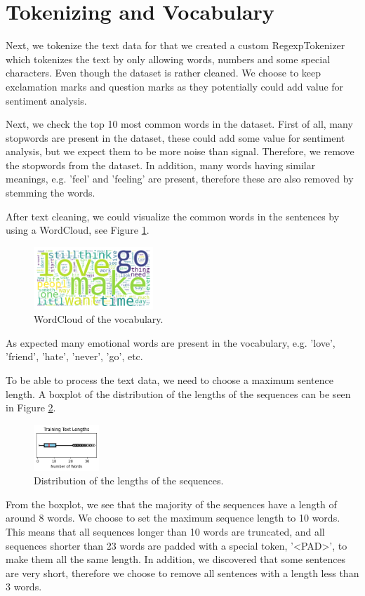 \section{Tokenizing and Vocabulary}
Next, we tokenize the text data for that we created a custom RegexpTokenizer which tokenizes the text by only allowing words, numbers and some special characters. Even though the dataset is rather cleaned. We choose to keep exclamation marks and question marks as they potentially could add value for sentiment analysis.

Next, we check the top 10 most common words in the dataset. First of all, many stopwords are present in the dataset, these could add some value for sentiment analysis, but we expect them to be more noise than signal. Therefore, we remove the stopwords from the dataset. In addition, many words having similar meanings, e.g. 'feel' and 'feeling' are present, therefore these are also removed by stemming the words.

After text cleaning, we could visualize the common words in the sentences by using a WordCloud, see Figure \ref{fig:wordcloud}.
\begin{figure}[H]
    \vspace*{0.7cm}
    \centering
    \includegraphics[width=0.4\textwidth]{figures/wordcloud.png}
    \caption{WordCloud of the vocabulary.}
    \label{fig:wordcloud}
    \vspace*{0.7cm}
\end{figure}
As expected many emotional words are present in the vocabulary, e.g. 'love', 'friend', 'hate', 'never', 'go', etc. 

To be able to process the text data, we need to choose a maximum sentence length. A boxplot of the distribution of the lengths of the sequences can be seen in Figure \ref{fig:sequence_length}.
\begin{figure}[H]
    \vspace*{0.7cm}
    \centering
    \includegraphics[width=0.22\textwidth]{figures/sentence_length.png}
    \caption{Distribution of the lengths of the sequences.}
    \label{fig:sequence_length}
    \vspace*{0.7cm}
\end{figure}
From the boxplot, we see that the majority of the sequences have a length of around 8 words. We choose to set the maximum sequence length to 10 words. This means that all sequences longer than 10 words are truncated, and all sequences shorter than 23 words are padded with a special token, '<PAD>', to make them all the same length. In addition, we discovered that some sentences are very short, therefore we choose to remove all sentences with a length less than 3 words.

